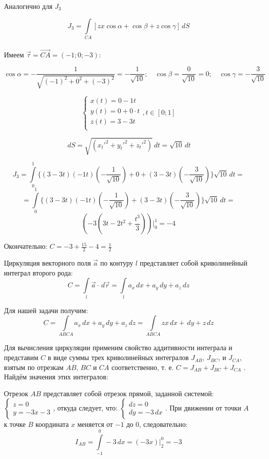 \documentclass[12pt]{article}
\begin{document}
	Аналогично для $ J_3 $ 

	$$J_3 = \int \limits_{CA} [ z x \cos{\alpha} + \cos{\beta} + z \cos{\gamma} ] \, dS $$\\
	Имеем $ \vec{\tau} = \vec{CA} = (-1; 0; -3) $:

	$$\cos\alpha = -\frac{1}{\sqrt{(-1)^2+0^2+(-3)^2}} = - \frac{1}{\sqrt{10}};\quad \cos\beta = \frac{0}{\sqrt{10}}=0;\quad \cos\gamma = -\frac{3}{\sqrt{10}}$$
		
	$$\begin{cases}
		x(t) = 0 - 1t\\
		y(t) = 0 + 0\cdot t\\
		z(t) = 3 - 3t\\
	\end{cases}, t \in [0;1]$$
		
	$$\,dS = \sqrt{(x_t'^2 + y_t'^2 + z_t'^2 )} \,dt = \sqrt{10} \,dt$$  

	$$ J_3 = \int \limits_{0}^1 \bigg\{  (3 - 3t) (- 1t) ( - \frac{1}{\sqrt{10}})  + 0 + (3 - 3t) (-\frac{3}{\sqrt{10}}) \bigg\} \sqrt{10} \, dt = $$
	$$ = \int \limits_{0}^1 \bigg\{  (3 - 3t) (- 1t) ( - \frac{1}{\sqrt{10}}) + (3 - 3t) (-\frac{3}{\sqrt{10}}) \bigg\} \sqrt{10} \, dt = $$
	$$ ( -3 (3 t - 2 t^2 + \frac{t^3}{3})) \Big|_0^1 = - 4  $$

	Окончательно: $ C = - 3 + \frac{15}{2} - 4  = \frac{1}{2} $
		
	Циркуляция векторного поля $ \vec{a} $ по контуру $ l $ представляет собой криволинейный интеграл второго рода:
	$$ C = \int \limits_{l} \vec{a} \cdot \,d\vec{r} = \int \limits_{l} a_x \,d x + a_y \,d y + a_z \,d z$$
		
	Для нашей задачи получим:
	$$ C = \int \limits_{ABCA} a_x \,d x + a_y \,d y + a_z \,d z = \int \limits_{ABCA} zx \,d x + \, dy + z \, dz $$		
		
	Для вычисления циркуляции применим свойство аддитивности интеграла и представим $ C $ в виде суммы трех криволинейных интегралов $ J_{AB} $, $ J_{BC} $, и $ J_{CA} $, взятым по отрезкам $ AB $, $ BC $ и $ CA $ соответственно, т. е. $ C =  J_{AB} + J_{BC} + J_{CA} $ . Найдём значения этих интегралов:
		
	Отрезок $ AB $ представляет собой отрезок прямой, заданной системой:\\
	$\begin{cases}
		z=0\\
		y= - 3x - 3
	\end{cases}$, откуда следует, что:
	$\begin{cases}
		dz=0\\
		dy=-3\,dx
	\end{cases}$.  При движении от точки $ A $ к точке $ B $ координата $ x $ меняется от $ -1 $ до $ 0 $, следовательно:
	$$ I_{AB} = \int \limits_{-1}^{0} -3 \, dx  = (-3x)\Big|_{2}^{0} = - 3 $$
		
\end{document}
